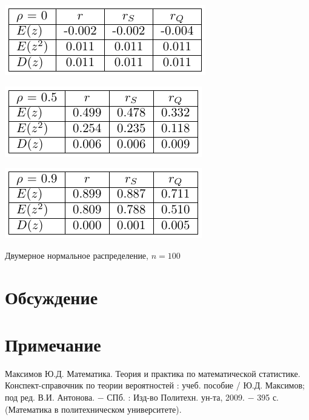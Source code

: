 \documentclass[a4paper]{article}
\begin{document}
\begin{table}[H]
    \begin{center}
    \includegraphics[]{LabSrcs/resources/100rho0.pdf}
    \end{center}
    \begin{center}
    \includegraphics[]{LabSrcs/resources/100rho0.5.pdf}
    \end{center}
    \begin{center}
    \includegraphics[]{LabSrcs/resources/100rho0.9.pdf}
    \end{center}
    \caption{Двумерное нормальное распределение, $n=100$}
    \label{tab:my_label}
\end{table}
\section{Обсуждение}
\section*{Примечание}
\begin{thebibliography}{9}
 Максимов Ю.Д. Математика. Теория и практика по математической статистике. Конспект-справочник по теории вероятностей : учеб. пособие /
Ю.Д. Максимов; под ред. В.И. Антонова. $-$ СПб. : Изд-во Политехн.
ун-та, 2009. $-$ 395 с. (Математика в политехническом университете).
\end{thebibliography}
\end{document}
